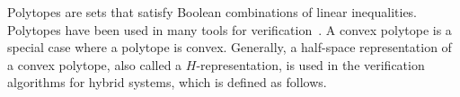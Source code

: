 Polytopes are sets that satisfy Boolean combinations of linear
inequalities.  Polytopes have been used in many tools for
verification~\cite{kvasnica2004multi,silva2000modeling,asarin2002d,bagnara2008parma,frehse2008phaver}.  A
convex polytope is a special case where a polytope is convex.
Generally, a half-space representation of a convex polytope, also
called a $H$-representation, is used in the verification algorithms
for hybrid systems, which is defined as follows.






